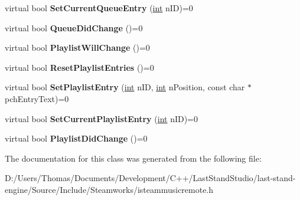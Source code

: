 \begin{DoxyCompactItemize}
\item 
\hypertarget{classISteamMusicRemote_af2158b129431d957a6d53845580385c6}{}virtual bool {\bfseries Set\+Current\+Queue\+Entry} (\hyperlink{SDL__thread_8h_a6a64f9be4433e4de6e2f2f548cf3c08e}{int} n\+I\+D)=0\label{classISteamMusicRemote_af2158b129431d957a6d53845580385c6}

\item 
\hypertarget{classISteamMusicRemote_abf68a2815d0b117224749cb9cb7d2634}{}virtual bool {\bfseries Queue\+Did\+Change} ()=0\label{classISteamMusicRemote_abf68a2815d0b117224749cb9cb7d2634}

\item 
\hypertarget{classISteamMusicRemote_ac61f8bcdcba0ce5648eda9b20022c4be}{}virtual bool {\bfseries Playlist\+Will\+Change} ()=0\label{classISteamMusicRemote_ac61f8bcdcba0ce5648eda9b20022c4be}

\item 
\hypertarget{classISteamMusicRemote_a11f6cfc2a0c36ce43cd07f983292f2ce}{}virtual bool {\bfseries Reset\+Playlist\+Entries} ()=0\label{classISteamMusicRemote_a11f6cfc2a0c36ce43cd07f983292f2ce}

\item 
\hypertarget{classISteamMusicRemote_a8fadd2d55499efcd4c6bef76dd4edc2d}{}virtual bool {\bfseries Set\+Playlist\+Entry} (\hyperlink{SDL__thread_8h_a6a64f9be4433e4de6e2f2f548cf3c08e}{int} n\+I\+D, \hyperlink{SDL__thread_8h_a6a64f9be4433e4de6e2f2f548cf3c08e}{int} n\+Position, const char $\ast$pch\+Entry\+Text)=0\label{classISteamMusicRemote_a8fadd2d55499efcd4c6bef76dd4edc2d}

\item 
\hypertarget{classISteamMusicRemote_a85d935efa2124ab4432313ac1dcf33c0}{}virtual bool {\bfseries Set\+Current\+Playlist\+Entry} (\hyperlink{SDL__thread_8h_a6a64f9be4433e4de6e2f2f548cf3c08e}{int} n\+I\+D)=0\label{classISteamMusicRemote_a85d935efa2124ab4432313ac1dcf33c0}

\item 
\hypertarget{classISteamMusicRemote_a64b1f8d04514e877cbb5b7136f49a0bf}{}virtual bool {\bfseries Playlist\+Did\+Change} ()=0\label{classISteamMusicRemote_a64b1f8d04514e877cbb5b7136f49a0bf}

\end{DoxyCompactItemize}


The documentation for this class was generated from the following file\+:\begin{DoxyCompactItemize}
\item 
D\+:/\+Users/\+Thomas/\+Documents/\+Development/\+C++/\+Last\+Stand\+Studio/last-\/stand-\/engine/\+Source/\+Include/\+Steamworks/isteammusicremote.\+h\end{DoxyCompactItemize}
